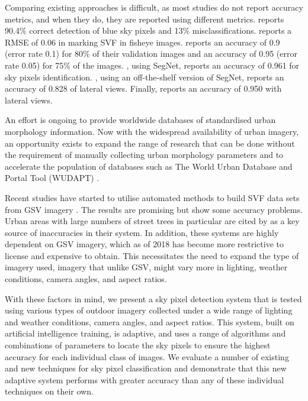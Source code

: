 \documentclass[final,3p,times,authoryear]{elsarticle}
\begin{document}

Comparing existing approaches is difficult, as most studies do not report accuracy metrics, and when they do, they are reported using different metrics. \cite{Luo2002} reports 90.4\% correct detection of blue sky pixels and 13\% misclassifications. \cite{Chapman2004} reports a RMSE of 0.06 in marking SVF in fisheye images. \cite{Schmitt2009} reports an accuracy of 0.9 (error rate 0.1) for 80\% of their validation images and an accuracy of 0.95 (error rate 0.05) for 75\% of the images. \cite{Liang2017}, using SegNet, reports an accuracy of 0.961 for sky pixels identification. \cite{Shen2018}, using an off-the-shelf version of SegNet, reports an accuracy of 0.828 of lateral views. Finally, \cite{Middel2019} reports an accuracy of 0.950 with lateral views.

An effort is ongoing to provide worldwide databases of standardised urban morphology information. Now with the widespread availability of urban imagery, an opportunity exists to expand the range of research that can be done without the requirement of manually collecting urban morphology parameters and to accelerate the population of databases such as The World Urban Database and Portal Tool (WUDAPT) \citep{Mills2015}.

Recent studies have started to utilise automated methods to build SVF data sets from GSV imagery \citep{Middel2018,Gong2018}. The results are promising but show some accuracy problems. Urban areas with large numbers of street trees in particular are cited by \cite{Gong2018} as a key source of inaccuracies in their system. In addition, these systems are highly dependent on GSV imagery, which as of 2018 has become more restrictive to license and expensive to obtain. This necessitates the need to expand the type of imagery used, imagery that unlike GSV, might vary more in lighting, weather conditions, camera angles, and aspect ratios. 

With these factors in mind, we present a sky pixel detection system that is tested using various types of outdoor imagery collected under a wide range of lighting and weather conditions, camera angles, and aspect ratios. This system, built on artificial intelligence training, is adaptive, and uses a range of algorithms and combinations of parameters to locate the sky pixels to ensure the highest accuracy for each individual class of images. We evaluate a number of existing and new techniques for sky pixel classification and demonstrate that this new adaptive system performs with greater accuracy than any of these individual techniques on their own.
\end{document}
